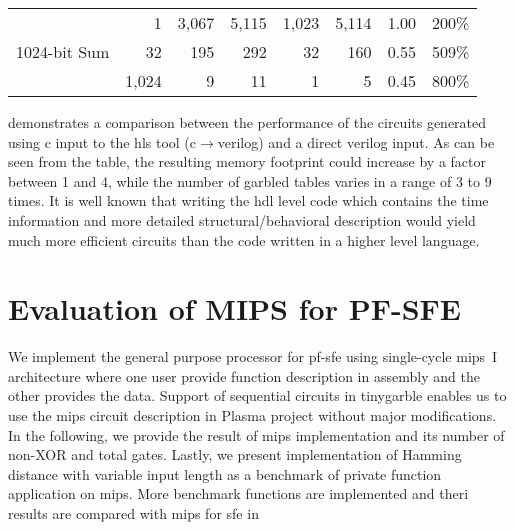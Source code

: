 \begin{table}
{\begin{tabular}{l|r||rr||rr||rr}
\multirow{3}{*}{1024-bit Sum}      & 1                                       & 3,067                       & 5,115                            & 1,023                       & 5,114                            & 1.00                    & 200\%                   \\
                                   & 32                                      & 195                         & 292                              & 32                          & 160                              & 0.55                    & 509\%                   \\
                                   & 1,024                                   & 9                           & 11                               & 1                           & 5                                & 0.45                    & 800\%
\end{tabular}
}
\end{table}

 demonstrates a comparison between the performance of the circuits generated using \gls{c} input to the \acrshort{hls} tool (\gls{c}$\rightarrow$\gls{verilog}) and a direct \gls{verilog} input.
As can be seen from the table, the resulting memory footprint could increase by a factor between 1 and 4, while the number of garbled tables varies in a range of 3 to 9 times.
It is well known that writing the \acrshort{hdl} level code which contains the time information and more detailed structural/behavioral description would yield much more efficient circuits than the code written in a higher level language.

\section{Evaluation of MIPS for PF-SFE} \label{sec:eval-mips-pf-sfe}
We implement the general purpose processor for \acrshort{pf-sfe} using single-cycle \gls{mips}~I architecture where one user provide function description in assembly and the other provides the data.
Support of sequential circuits in \gls{tinygarble} enables us to use the \gls{mips} circuit description in Plasma project \cite{rhoads2006plasma} without major modifications.
In the following, we provide the result of \gls{mips} implementation and its number of non-XOR and total gates.
Lastly, we present implementation of Hamming distance with variable input length as a benchmark of private function application on \gls{mips}.
More benchmark functions are implemented and theri results are compared with \gls{mips} for \gls{sfe} in 

